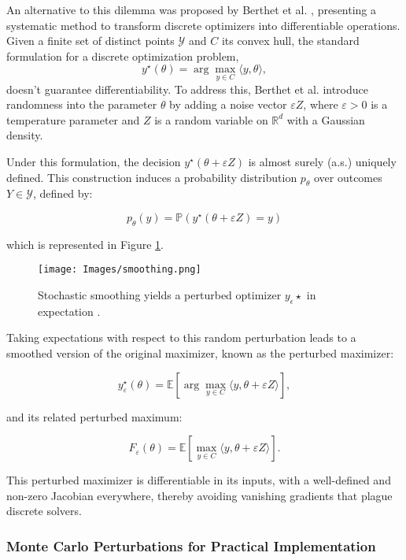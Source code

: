An alternative to this dilemma was proposed by Berthet et al. \cite{berthetLearningDifferentiablePertubed2020}, presenting a systematic method to transform discrete optimizers into differentiable operations. Given a finite set of distinct points $\mathcal{Y}$ and $C$ its convex hull, the standard formulation for a discrete optimization problem, 
\[y^\star(\theta) = \arg \max_{y \in C} \langle y, \theta \rangle \tag{4},\]
doesn't guarantee differentiability. To address this, Berthet et al. introduce randomness into the parameter $\theta$ by adding a noise vector $\varepsilon Z$, where $\varepsilon > 0$ is a temperature parameter and $Z$ is a random variable on $\mathbb{R}^d$ with a Gaussian density.

Under this formulation, the decision $y^\star(\theta + \varepsilon Z)$ is almost surely (a.s.) uniquely defined. This construction induces a probability distribution $p_\theta$ over outcomes $Y \in \mathcal{Y}$, defined by: 

\[
p_\theta(y) = \mathbb{P}(y^\star(\theta + \varepsilon Z) = y) \tag{5}
\]

which is represented in Figure \ref{fig:smoothing}.

\begin{figure}
    \centering
    \texttt{[image: Images/smoothing.png]}
    \caption{Stochastic smoothing yields a perturbed optimizer \(y_\epsilon \star\) in expectation \cite{berthetLearningDifferentiablePertubed2020}.}
    \label{fig:smoothing}
\end{figure}

Taking expectations with respect to this random perturbation leads to a smoothed version of the original maximizer, known as the perturbed maximizer: 

\[
y^\star_\varepsilon(\theta) = \mathbb{E}[\arg \max_{y \in C} \langle y, \theta + \varepsilon Z \rangle], \tag{6}
\]

and its related perturbed maximum:

\[
F_{\varepsilon}(\theta) = \mathbb{E}[\max_{y \in C} \langle y, \theta + \varepsilon Z \rangle]. \tag{7}
\]

This perturbed maximizer is differentiable in its inputs, with a well-defined and non-zero Jacobian everywhere, thereby avoiding vanishing gradients that plague discrete solvers.

\subsubsection{Monte Carlo Perturbations for Practical Implementation}

